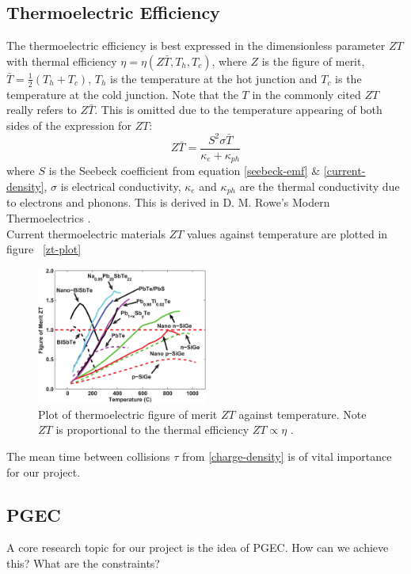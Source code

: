 \documentclass[a4paper,12pt]{article}
\newcommand{\figref}[2][\figurename~]{#1\ref{#2}}
\begin{document}
\subsection{Thermoelectric Efficiency}
The thermoelectric efficiency is best expressed in the dimensionless
parameter $ZT$ with thermal efficiency $\eta = \eta (Z\bar{T}, T_h,
T_c)$, where $Z$ is the figure of merit, $\bar{T} = \frac{1}{2}(T_h +
T_c)$, $T_h$ is the temperature at the hot junction and $T_c$ is the
temperature at the cold junction. Note that the $T$ in the commonly
cited $ZT$ really refers to $Z \bar{T}$. This is omitted due to the
temperature appearing of both sides of the expression for $ZT$:
\begin{equation}
\label{zt}
	Z \bar{T} = \frac{S^2 \sigma \bar{T}}{\kappa_e + \kappa_{ph}}
\end{equation}
where $S$ is the Seebeck coefficient from equation \eqref{seebeck-emf}
\& \eqref{current-density}, $\sigma$ is electrical conductivity,
$\kappa_e$ and $\kappa_{ph}$ are the thermal conductivity due to
electrons and phonons. This is derived in D. M. Rowe's Modern
Thermoelectrics \cite{modern-thermoelectrics}.\\
Current thermoelectric materials $ZT$ values against temperature are
plotted in figure \figref{zt-plot}

\begin{figure}
	\centering
	\includegraphics[width=0.5\textwidth]{zt-temp-plot.png}
	\caption{Plot of thermoelectric figure of merit $ZT$ against
	temperature. Note $ZT$ is proportional to the thermal efficiency
	$ZT \propto \eta$ \cite{minnich-review}.}
\end{figure}

The mean time between collisions $\tau$ from \eqref{charge-density} is
of vital importance for our project.

\subsection{\acf{PGEC}}
A core research topic for our project is the idea of \ac{PGEC}. How can
we achieve this? What are the constraints?
\end{document}
